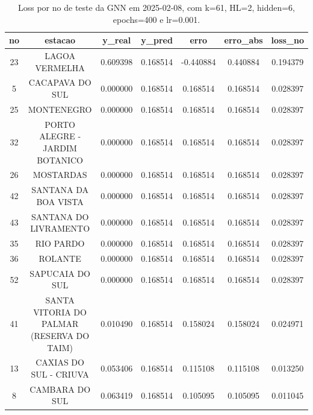 \begin{table}[h]
\centering
\caption{Loss por no de teste da GNN em 2025-02-08, com k=61, HL=2, hidden=6, epochs=400 e lr=0.001.}
\label{tab:gnn_loss_k61_hl2_h6_e400_d20250208}
\begin{tabular}{ccccccc}
\toprule
no & estacao & y\_real & y\_pred & erro & erro\_abs & loss\_no \\
\midrule
23 & LAGOA VERMELHA & 0.609398 & 0.168514 & -0.440884 & 0.440884 & 0.194379 \\
5 & CACAPAVA DO SUL & 0.000000 & 0.168514 & 0.168514 & 0.168514 & 0.028397 \\
25 & MONTENEGRO & 0.000000 & 0.168514 & 0.168514 & 0.168514 & 0.028397 \\
32 & PORTO ALEGRE - JARDIM BOTANICO & 0.000000 & 0.168514 & 0.168514 & 0.168514 & 0.028397 \\
26 & MOSTARDAS & 0.000000 & 0.168514 & 0.168514 & 0.168514 & 0.028397 \\
42 & SANTANA DA BOA VISTA & 0.000000 & 0.168514 & 0.168514 & 0.168514 & 0.028397 \\
43 & SANTANA DO LIVRAMENTO & 0.000000 & 0.168514 & 0.168514 & 0.168514 & 0.028397 \\
35 & RIO PARDO & 0.000000 & 0.168514 & 0.168514 & 0.168514 & 0.028397 \\
36 & ROLANTE & 0.000000 & 0.168514 & 0.168514 & 0.168514 & 0.028397 \\
52 & SAPUCAIA DO SUL & 0.000000 & 0.168514 & 0.168514 & 0.168514 & 0.028397 \\
41 & SANTA VITORIA DO PALMAR (RESERVA DO TAIM) & 0.010490 & 0.168514 & 0.158024 & 0.158024 & 0.024971 \\
13 & CAXIAS DO SUL - CRIUVA & 0.053406 & 0.168514 & 0.115108 & 0.115108 & 0.013250 \\
8 & CAMBARA DO SUL & 0.063419 & 0.168514 & 0.105095 & 0.105095 & 0.011045 \\
\bottomrule
\end{tabular}
\end{table}
